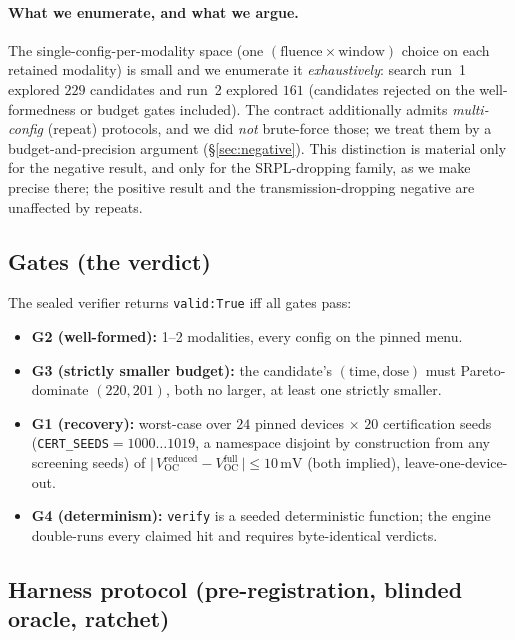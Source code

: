 \documentclass[11pt]{article}
\newcommand{\Voc}{V_{\mathrm{OC}}}
\newcommand{\mV}{\,\mathrm{mV}}
\begin{document}
\paragraph{What we enumerate, and what we argue.} The single-config-per-modality space (one $(\text{fluence}\times\text{window})$ choice on each retained modality) is small and we enumerate it \emph{exhaustively}: search run~1 explored $229$ candidates and run~2 explored $161$ (candidates rejected on the well-formedness or budget gates included). The contract additionally admits \emph{multi-config} (repeat) protocols, and we did \emph{not} brute-force those; we treat them by a budget-and-precision argument (\S\ref{sec:negative}). This distinction is material only for the negative result, and only for the SRPL-dropping family, as we make precise there; the positive result and the transmission-dropping negative are unaffected by repeats.

\subsection{Gates (the verdict)}

The sealed verifier returns \texttt{valid:True} iff all gates pass:
\begin{itemize}
\item \textbf{G2 (well-formed):} 1--2 modalities, every config on the pinned menu.
\item \textbf{G3 (strictly smaller budget):} the candidate's $(\text{time},\text{dose})$ must Pareto-dominate $(220,201)$, both no larger, at least one strictly smaller.
\item \textbf{G1 (recovery):} worst-case over $24$ pinned devices $\times$ $20$ certification seeds (\texttt{CERT\_SEEDS}$=1000\ldots1019$, a namespace disjoint by construction from any screening seeds) of $\bigl|\,\Voc^{\mathrm{reduced}} - \Voc^{\mathrm{full}}\,\bigr| \le 10\mV$ (both implied), leave-one-device-out.
\item \textbf{G4 (determinism):} \texttt{verify} is a seeded deterministic function; the engine double-runs every claimed hit and requires byte-identical verdicts.
\end{itemize}

\subsection{Harness protocol (pre-registration, blinded oracle, ratchet)}
\label{sec:harness}
\end{document}
